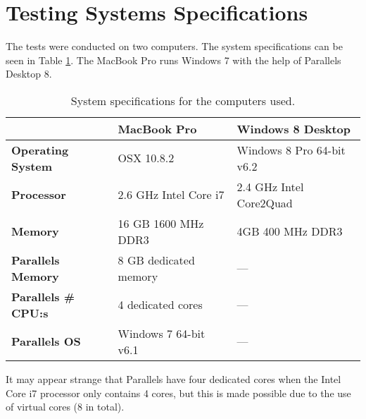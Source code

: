 \section{Testing Systems Specifications} \label{sec:system_specs}
The tests were conducted on two computers. The system specifications can be seen in Table \ref{table:system_specs}. The MacBook Pro runs Windows 7 with the help of Parallels Desktop 8. 

\begin{table}[h]
	\begin{center}
		\begin{tabular} { m{4cm} | m{4cm}  | m{5cm} }
			\hline
			\textbf{} & \textbf{MacBook Pro} & 
			\textbf{Windows 8 Desktop}  \\ \hline

			\textbf{Operating System}		& OSX 10.8.2 
											& Windows 8 Pro 64-bit v6.2 \\ \hline

			\textbf{Processor}				& 2.6 GHz Intel Core i7 
											& 2.4 GHz Intel Core2Quad  \\ \hline

			\textbf{Memory}					& 16 GB 1600 MHz DDR3
											& 4GB 400 MHz DDR3 \\ \hline

			\textbf{Parallels Memory}		& 8 GB dedicated memory 
											& --- \\ \hline

			\textbf{Parallels \# CPU:s} 	& 4 dedicated cores
											& --- \\ \hline

			\textbf{Parallels OS} 			& Windows 7 64-bit v6.1
											& --- \\ \hline
		\end{tabular}
	\end{center}
	\caption{System specifications for the computers used.}
	\label{table:system_specs}
\end{table}
It may appear strange that Parallels have four dedicated cores when the Intel Core i7 processor only contains 4 cores, but this is made possible due to the use of virtual cores (8 in total).



